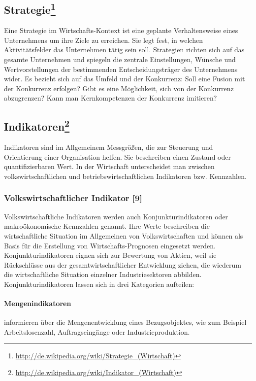 \subsection[Strategie]{Strategie\footnote{\url{ http://de.wikipedia.org/wiki/Strategie_(Wirtschaft)}}}
Eine Strategie im Wirtschafts-Kontext ist eine geplante Verhaltensweise eines Unternehmens um ihre Ziele zu erreichen. Sie legt fest, in welchen Aktivitätsfelder das Unternehmen tätig sein soll. Strategien richten sich auf das gesamte Unternehmen und spiegeln die zentrale Einstellungen, Wünsche und Wertvorstellungen der bestimmenden Entscheidungsträger des Unternehmens wider. Es bezieht sich auf das Umfeld und der Konkurrenz: Soll eine Fusion mit der Konkurrenz erfolgen? Gibt es eine Möglichkeit, sich von der Konkurrenz abzugrenzen? Kann man Kernkompetenzen der Konkurrenz imitieren? 



\subsection[Indikatoren]{Indikatoren\footnote{\url{ http://de.wikipedia.org/wiki/Indikator_(Wirtschaft)}}}

Indikatoren sind im Allgemeinem Messgrößen, die zur Steuerung und Orientierung einer Organisation helfen. Sie beschreiben einen Zustand oder quantifizierbaren Wert. In der Wirtschaft unterscheidet man zwischen volkswirtschaftlichen und betriebswirtschaftlichen Indikatoren bzw. Kennzahlen.

\subsubsection{Volkswirtschaftlicher Indikator [9]}

Volkswirtschaftliche Indikatoren werden auch Konjunkturindikatoren oder makroökonomische Kennzahlen genannt. Ihre Werte beschreiben die wirtschaftliche Situation im Allgemeinen von Volkswirtschaften und können als Basis für die Erstellung von Wirtschafts-Prognosen eingesetzt werden. 
\\
Konjunkturindikatoren eignen sich zur Bewertung von Aktien, weil sie Rück\-schlüsse aus der gesamtwirtschaftlicher Entwicklung ziehen, die wiederum die wirtschaftliche Situation einzelner Industriesektoren abbilden. Konjunkturindikatoren lassen sich in drei Kategorien aufteilen:

\paragraph{Mengenindikatoren} informieren über die Mengenentwicklung eines Bezugsobjektes, wie zum Beispiel Arbeitslosenzahl, Auftragseingänge oder Industrieproduktion.
